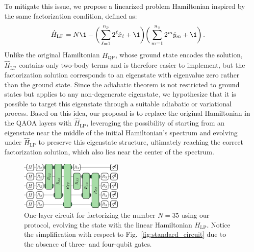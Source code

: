 To mitigate this issue, we propose a linearized problem Hamiltonian inspired by the same factorization condition, defined as:
\begin{equation}
	\hat{H}_\mathrm{LP} = N \1 - \bigg( \sum_{\ell=1}^{n_p} 2^\ell \hat{x}_\ell + \1 \bigg)
	\bigg( \sum_{m=1}^{n_q} 2^m \hat{y}_m + \1 \bigg)\,.
	\label{eq:linear_problem_hamiltonian}
\end{equation}
Unlike the original Hamiltonian $\hat{H}_\mathrm{QP}$, whose ground state encodes the solution, $\hat{H}_\mathrm{LP}$ contains only two-body terms and is therefore easier to implement, but the factorization solution corresponds to an eigenstate with eigenvalue zero rather than the ground state. Since the adiabatic theorem is not restricted to ground states but applies to any non-degenerate eigenstate, we hypothesize that it is possible to target this eigenstate through a suitable adiabatic or variational process. Based on this idea, our proposal is to replace the original Hamiltonian in the QAOA layers with $\hat{H}_\mathrm{LP}$, leveraging the possibility of starting from an eigenstate near the middle of the initial Hamiltonian’s spectrum and evolving under $\hat{H}_\mathrm{LP}$ to preserve this eigenstate structure, ultimately reaching the correct factorization solution, which also lies near the center of the spectrum.

\begin{figure}[h]
    \centering
    \includegraphics[width=0.45\textwidth]{02-factorization/figs/linear_circuit_35.pdf}
    \caption{One-layer circuit for factorizing the number $N=35$ using our protocol, evolving the state with the linear Hamiltonian $H_{\mathrm{LP}}$. Notice the simplification with respect to Fig.~\ref{fig:standard_circuit}
    due to the absence of three- and four-qubit gates.}
    \label{fig:linear_circuit_35.pdf}
\end{figure}